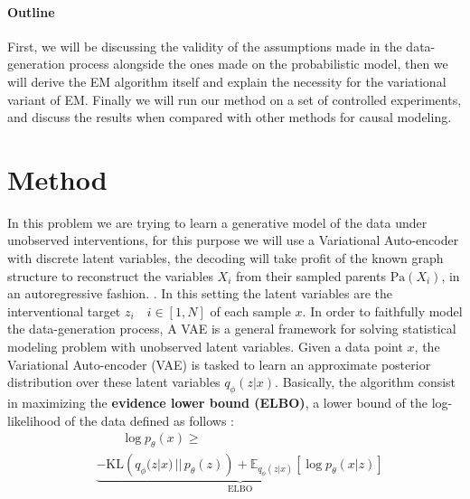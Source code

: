 \documentclass{article}
\begin{document}
\paragraph{Outline} First, we will be discussing the validity of the assumptions made in the data-generation process alongside the ones made on the probabilistic model, then we will derive the EM algorithm itself and explain the necessity for the variational variant of EM. Finally we will run our method on a set of controlled experiments, and discuss the results when compared with other methods for causal modeling.


\section{Method}\label{subsec:Method}

In this problem we are trying to learn a generative model of the data under unobserved interventions, for this purpose we will use a Variational Auto-encoder \citep{kingma2022autoencodingvariationalbayes}
with discrete latent variables, the decoding will take profit of the known graph structure to reconstruct the variables $X_i$ from their sampled parents $\text{Pa}(X_i)$, in an autoregressive fashion.
. In this setting the latent variables are the interventional target $z_i \quad i \in [1,N]$ of each sample $x$. In order to faithfully model the data-generation process,
A VAE is a general framework for solving statistical modeling problem with unobserved latent variables. Given a data point $x$, the Variational Auto-encoder (VAE) is tasked to learn an approximate posterior distribution over these latent variables $q_\phi(z | x)$. Basically, the algorithm consist in maximizing the \textbf{evidence lower bound (ELBO)}, a lower bound of the log-likelihood of the data defined as follows :
\begin{align*}
    &\quad\quad \log p_\theta(x) \geq  \\
    & \underbrace{ - \text{KL}\left(q_\phi(z | x) \,||\, p_\theta(z)\right)+ \mathbb{E}_{q_\phi(z | x)} \left[ \log p_\theta(x | z) \right]}_{\text{ELBO}}
\end{align*}
\end{document}
